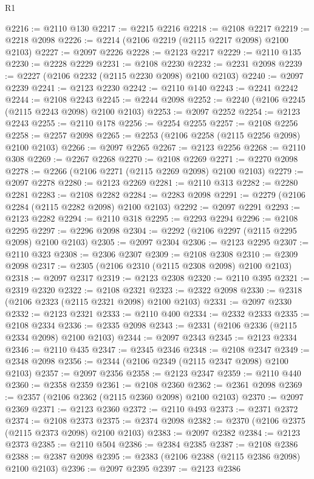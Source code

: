 \begin{lexlean}{R1}
\begin{coremodule}
@2216 := @2110 @130
@2217 := @2215 @2216
@2218 := @2108 @2217
@2219 := @2218 @2098
@2226 := @2214 (@2106 @2219 (@2115 @2217 @2098) @2100 @2103)
@2227 := @2097 @2226
@2228 := @2123 @2217
@2229 := @2110 @135
@2230 := @2228 @2229
@2231 := @2108 @2230
@2232 := @2231 @2098
@2239 := @2227 (@2106 @2232 (@2115 @2230 @2098) @2100 @2103)
@2240 := @2097 @2239
@2241 := @2123 @2230
@2242 := @2110 @140
@2243 := @2241 @2242
@2244 := @2108 @2243
@2245 := @2244 @2098
@2252 := @2240 (@2106 @2245 (@2115 @2243 @2098) @2100 @2103)
@2253 := @2097 @2252
@2254 := @2123 @2243
@2255 := @2110 @178
@2256 := @2254 @2255
@2257 := @2108 @2256
@2258 := @2257 @2098
@2265 := @2253 (@2106 @2258 (@2115 @2256 @2098) @2100 @2103)
@2266 := @2097 @2265
@2267 := @2123 @2256
@2268 := @2110 @308
@2269 := @2267 @2268
@2270 := @2108 @2269
@2271 := @2270 @2098
@2278 := @2266 (@2106 @2271 (@2115 @2269 @2098) @2100 @2103)
@2279 := @2097 @2278
@2280 := @2123 @2269
@2281 := @2110 @313
@2282 := @2280 @2281
@2283 := @2108 @2282
@2284 := @2283 @2098
@2291 := @2279 (@2106 @2284 (@2115 @2282 @2098) @2100 @2103)
@2292 := @2097 @2291
@2293 := @2123 @2282
@2294 := @2110 @318
@2295 := @2293 @2294
@2296 := @2108 @2295
@2297 := @2296 @2098
@2304 := @2292 (@2106 @2297 (@2115 @2295 @2098) @2100 @2103)
@2305 := @2097 @2304
@2306 := @2123 @2295
@2307 := @2110 @323
@2308 := @2306 @2307
@2309 := @2108 @2308
@2310 := @2309 @2098
@2317 := @2305 (@2106 @2310 (@2115 @2308 @2098) @2100 @2103)
@2318 := @2097 @2317
@2319 := @2123 @2308
@2320 := @2110 @395
@2321 := @2319 @2320
@2322 := @2108 @2321
@2323 := @2322 @2098
@2330 := @2318 (@2106 @2323 (@2115 @2321 @2098) @2100 @2103)
@2331 := @2097 @2330
@2332 := @2123 @2321
@2333 := @2110 @400
@2334 := @2332 @2333
@2335 := @2108 @2334
@2336 := @2335 @2098
@2343 := @2331 (@2106 @2336 (@2115 @2334 @2098) @2100 @2103)
@2344 := @2097 @2343
@2345 := @2123 @2334
@2346 := @2110 @435
@2347 := @2345 @2346
@2348 := @2108 @2347
@2349 := @2348 @2098
@2356 := @2344 (@2106 @2349 (@2115 @2347 @2098) @2100 @2103)
@2357 := @2097 @2356
@2358 := @2123 @2347
@2359 := @2110 @440
@2360 := @2358 @2359
@2361 := @2108 @2360
@2362 := @2361 @2098
@2369 := @2357 (@2106 @2362 (@2115 @2360 @2098) @2100 @2103)
@2370 := @2097 @2369
@2371 := @2123 @2360
@2372 := @2110 @493
@2373 := @2371 @2372
@2374 := @2108 @2373
@2375 := @2374 @2098
@2382 := @2370 (@2106 @2375 (@2115 @2373 @2098) @2100 @2103)
@2383 := @2097 @2382
@2384 := @2123 @2373
@2385 := @2110 @504
@2386 := @2384 @2385
@2387 := @2108 @2386
@2388 := @2387 @2098
@2395 := @2383 (@2106 @2388 (@2115 @2386 @2098) @2100 @2103)
@2396 := @2097 @2395
@2397 := @2123 @2386

\end{coremodule}
\end{lexlean}
